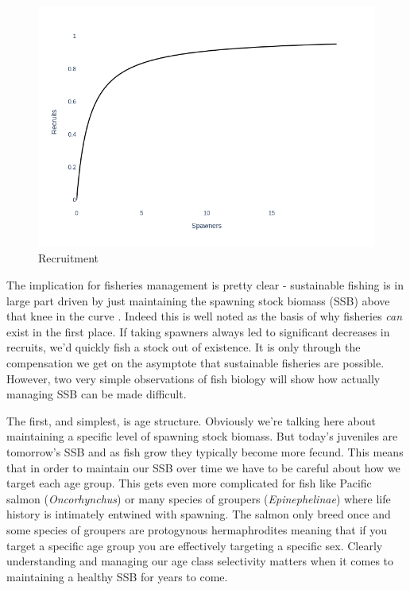 \documentclass[11pt]{article}
\begin{document}
\begin{figure}[h!] 
  \includegraphics[width=\linewidth]{recruitment.png}
  \caption{Recruitment}
  \label{fig:recruitment}
\end{figure}



The implication for fisheries management is pretty clear - sustainable fishing is in large part driven by just maintaining the spawning stock biomass (SSB) above that knee in the curve \citep{waltersmartell} \citep{king}. Indeed this is well noted as the basis of why fisheries \textit{can} exist in the first place. If taking spawners always led to significant decreases in recruits, we'd quickly fish a stock out of existence. It is only through the compensation we get on the asymptote that sustainable fisheries are possible. However, two very simple observations of fish biology will show how actually managing SSB can be made difficult. \newline

The first, and simplest, is age structure. Obviously we're talking here about maintaining a specific level of spawning stock biomass. But today's juveniles are tomorrow's SSB and as fish grow they typically become more fecund. This means that in order to maintain our SSB over time we have to be careful about how we target each age group. This gets even more complicated for fish like Pacific salmon (\textit{Oncorhynchus}) or many species of groupers (\textit{Epinephelinae}) where life history is intimately entwined with spawning. The salmon only breed once \citep{NOAA24} and some species of groupers are protogynous hermaphrodites \citep{RedGrouper} meaning that if you target a specific age group you are effectively targeting a specific sex. Clearly understanding and managing our age class selectivity matters when it comes to maintaining a healthy SSB for years to come. \newline
\end{document}
